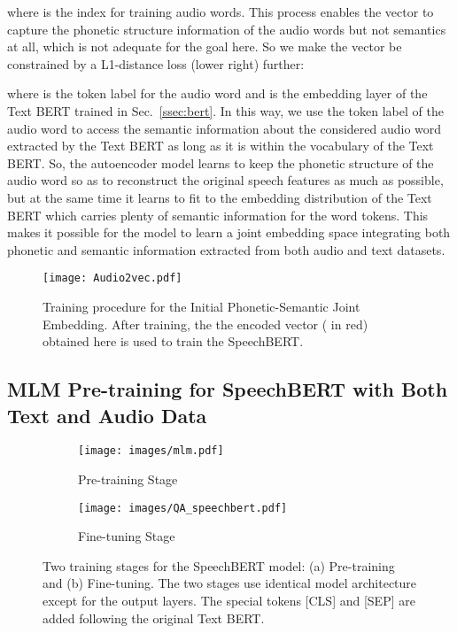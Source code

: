 \documentclass[a4paper]{article}
\begin{document}
where  is the index for training audio words. This process enables the vector  to capture the phonetic structure information of the audio words but not semantics at all, which is not adequate for the goal here. So we make the vector  be constrained by a L1-distance loss (lower right) further:
\vspace{-5pt}

where  is the token label for the audio word  and  is the embedding layer of the Text BERT trained in Sec.~\ref{ssec:bert}. In this way, we use the token label of the audio word to access the semantic information about the considered audio word extracted by the Text BERT as long as it is within the vocabulary of the Text BERT. So, the autoencoder model learns to keep the phonetic structure of the audio word so as to reconstruct the original speech features  as much as possible, but at the same time it learns to fit to the embedding distribution of the Text BERT which carries plenty of semantic information for the word tokens. This makes it possible for the model to learn a joint embedding space integrating both phonetic and semantic information extracted from both audio and text datasets.

\begin{figure}[t!]
    \centering
    \texttt{[image: Audio2vec.pdf]}
    \caption{Training procedure for the Initial Phonetic-Semantic Joint Embedding. After training, the the encoded vector ( in red) obtained here is used to train the SpeechBERT.}
    \label{fig:audio2vec}
    \vspace{-15pt}
\end{figure}

\vspace{-5pt}
\subsection{MLM Pre-training for SpeechBERT with Both Text and Audio Data}
\label{ssec:trainproc}

\begin{figure*}[t!]
    \centering
    \begin{subfigure}{\columnwidth}
        \centering
        \texttt{[image: images/mlm.pdf]}   
        \caption{Pre-training Stage}
    \end{subfigure}
    \begin{subfigure}{\columnwidth}
        \centering
        \texttt{[image: images/QA\_speechbert.pdf]}
        \caption{Fine-tuning Stage}
    \end{subfigure}
    \caption{Two training stages for the SpeechBERT model: (a) Pre-training and (b) Fine-tuning. The two stages use identical model architecture except for the output layers. The special tokens [CLS] and [SEP] are added following the original Text BERT.}
    \label{fig:speechbert}
    \vspace{-15pt}
\end{figure*}
\end{document}
